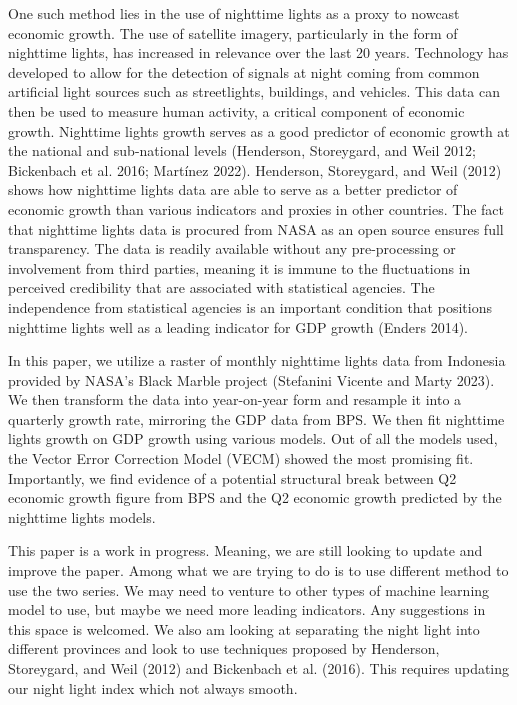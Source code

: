 \documentclass[
]{interact}
\begin{document}
One such method lies in the use of nighttime lights as a proxy to
nowcast economic growth. The use of satellite imagery, particularly in
the form of nighttime lights, has increased in relevance over the last
20 years. Technology has developed to allow for the detection of signals
at night coming from common artificial light sources such as
streetlights, buildings, and vehicles. This data can then be used to
measure human activity, a critical component of economic growth.
Nighttime lights growth serves as a good predictor of economic growth at
the national and sub-national levels (Henderson, Storeygard, and Weil
2012; Bickenbach et al. 2016; Martínez 2022). Henderson, Storeygard, and
Weil (2012) shows how nighttime lights data are able to serve as a
better predictor of economic growth than various indicators and proxies
in other countries. The fact that nighttime lights data is procured from
NASA as an open source ensures full transparency. The data is readily
available without any pre-processing or involvement from third parties,
meaning it is immune to the fluctuations in perceived credibility that
are associated with statistical agencies. The independence from
statistical agencies is an important condition that positions nighttime
lights well as a leading indicator for GDP growth (Enders 2014).

In this paper, we utilize a raster of monthly nighttime lights data from
Indonesia provided by NASA's Black Marble project (Stefanini Vicente and
Marty 2023). We then transform the data into year-on-year form and
resample it into a quarterly growth rate, mirroring the GDP data from
BPS. We then fit nighttime lights growth on GDP growth using various
models. Out of all the models used, the Vector Error Correction Model
(VECM) showed the most promising fit. Importantly, we find evidence of a
potential structural break between Q2 economic growth figure from BPS
and the Q2 economic growth predicted by the nighttime lights models.

This paper is a work in progress. Meaning, we are still looking to
update and improve the paper. Among what we are trying to do is to use
different method to use the two series. We may need to venture to other
types of machine learning model to use, but maybe we need more leading
indicators. Any suggestions in this space is welcomed. We also am
looking at separating the night light into different provinces and look
to use techniques proposed by Henderson, Storeygard, and Weil (2012) and
Bickenbach et al. (2016). This requires updating our night light index
which not always smooth.
\end{document}

